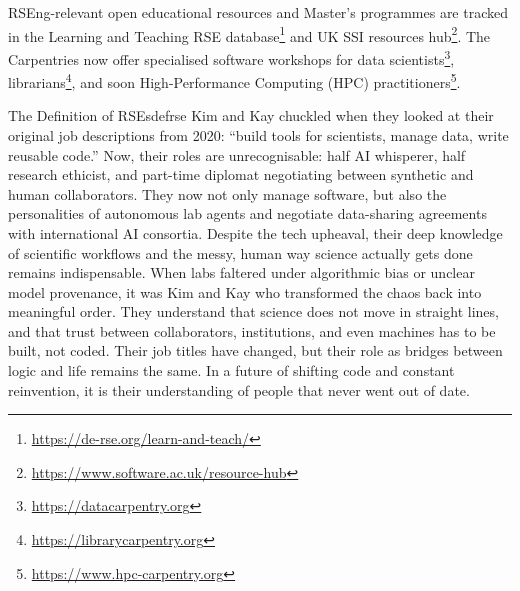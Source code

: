 \documentclass{eceasst}
\begin{document}
RSEng-relevant open educational resources and Master's programmes are tracked
in the Learning and Teaching RSE database\footnote{\url{https://de-rse.org/learn-and-teach/}}
and UK SSI resources hub\footnote{\url{https://www.software.ac.uk/resource-hub}}.
The Carpentries now offer specialised software workshops
for data scientists\footnote{\url{https://datacarpentry.org}},
librarians\footnote{\url{https://librarycarpentry.org}},
and soon High-Performance Computing (HPC) practitioners\footnote{\url{https://www.hpc-carpentry.org}}.

\begin{story}{The Definition of RSEs}{defrse}
Kim and Kay chuckled when they looked at their original job descriptions from 2020: ``build tools for scientists, manage data, write reusable code.''
Now, their roles are unrecognisable: half AI whisperer, half research ethicist, and part-time diplomat negotiating between synthetic and human collaborators.
They now not only manage software, but also the personalities of autonomous lab agents and negotiate data-sharing agreements with international AI consortia.
Despite the tech upheaval, their deep knowledge of scientific workflows and the messy, human way science actually gets done remains indispensable.
When labs faltered under algorithmic bias or unclear model provenance, it was Kim and Kay who transformed the chaos back into meaningful order.
They understand that science does not move in straight lines, and that trust between collaborators, institutions, and even machines has to be built, not coded.
Their job titles have changed, but their role as bridges between logic and life remains the same.
In a future of shifting code and constant reinvention, it is their understanding of people that never went out of date.

\end{story}
\end{document}
